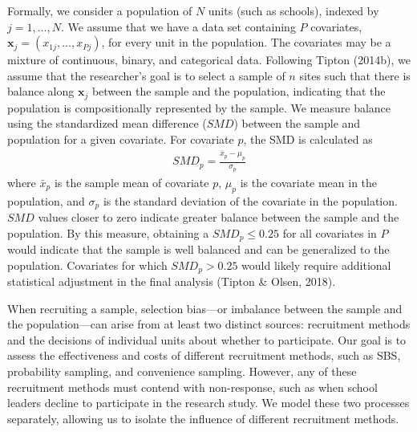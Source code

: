 \documentclass[
  english,
  man,floatsintext]{apa6}
\begin{document}
Formally, we consider a population of \(N\) units (such as schools), indexed by \(j = 1,...,N\).
We assume that we have a data set containing \(P\) covariates, \(\mathbf{x}_j = \left(x_{1j},...,x_{Pj}\right)\), for every unit in the population. The covariates may be a mixture of continuous, binary, and categorical data.
Following Tipton (2014b), we assume that the researcher's goal is to select a sample of \(n\) sites such that there is balance along \(\mathbf{x}_j\) between the sample and the population, indicating that the population is compositionally represented by the sample.
We measure balance using the standardized mean difference (\(SMD\)) between the sample and population for a given covariate. For covariate \(p\), the SMD is calculated as
\begin{align} \label{eq:SMD}
SMD_p = \frac{\bar{x}_p - \mu_p}{\sigma_p}
\end{align}
where \(\bar{x}_p\) is the sample mean of covariate \(p\), \(\mu_p\) is the covariate mean in the population, and \(\sigma_p\) is the standard deviation of the covariate in the population. \(SMD\) values closer to zero indicate greater balance between the sample and the population. By this measure, obtaining a \(SMD_p \le 0.25\) for all covariates in \(P\) would indicate that the sample is well balanced and can be generalized to the population. Covariates for which \(SMD_p > 0.25\) would likely require additional statistical adjustment in the final analysis (Tipton \& Olsen, 2018).

When recruiting a sample, selection bias---or imbalance between the sample and the population---can arise from at least two distinct sources: recruitment methods and the decisions of individual units about whether to participate. Our goal is to assess the effectiveness and costs of different recruitment methods, such as SBS, probability sampling, and convenience sampling. However, any of these recruitment methods must contend with non-response, such as when school leaders decline to participate in the research study.
We model these two processes separately, allowing us to isolate the influence of different recruitment methods.
\end{document}
